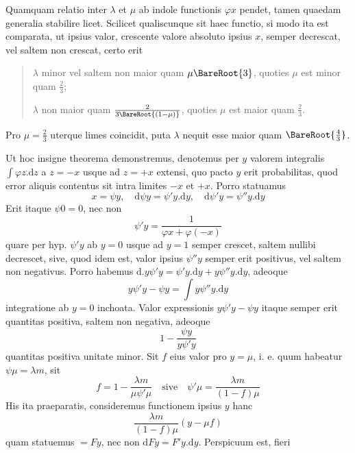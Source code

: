 Quamquam relatio inter \(\lambda\) et \(\mu\) ab indole functionis \(\varphi x\) pendet, tamen quaedam generalia stabilire licet. Scilicet qualiscunque sit haec functio, si modo ita est comparata, ut ipsius valor, crescente valore absoluto ipsius \(x\), semper decrescat, vel saltem non crescat, certo erit
\begin{quote}
\(\lambda\) minor vel saltem non maior quam \(\mu\BareRoot{3}\), quoties \(\mu\) est minor quam \(\tfrac23\);

\(\lambda\) non maior quam \(\frac{2}{3\BareRoot{(1-\mu)}}\), quoties \(\mu\) est maior quam \(\tfrac23\).
\end{quote}
Pro \(\mu=\tfrac23\) uterque limes coincidit, puta \(\lambda\) nequit esse maior quam \(\BareRoot{\tfrac43}\).

Ut hoc insigne theorema demonstremus, denotemus per \(y\) valorem integralis \(\int\varphi z.\mathrm{d}z\) a \(z=-x\) usque ad \(z=+x\) extensi, quo pacto \(y\) erit probabilitas, quod error aliquis contentus sit intra limites \(-x\) et \(+x\). Porro statuamus
\[
x=\psi y,\quad \mathrm{d}\psi y=\psi'y.\mathrm{d}y,\quad \mathrm{d}\psi'y=\psi''y.\mathrm{d}y
\]
Erit itaque \(\psi0=0\), nec non
\[
\psi'y=\frac{1}{\varphi x+\varphi(-x)}
\]
quare per hyp. \(\psi'y\) ab \(y=0\) usque ad \(y=1\) semper crescet, saltem nullibi decrescet, sive, quod idem est, valor ipsius \(\psi''y\) semper erit positivus, vel saltem non negativus. Porro habemus \(\mathrm{d}.y\psi'y=\psi'y.\mathrm{d}y+y\psi''y.\mathrm{d}y\), adeoque
\[
y\psi'y-\psi y=\int y\psi''y.\mathrm{d}y
\]
integratione ab \(y=0\) inchoata. Valor expressionis \(y\psi'y-\psi y\) itaque semper erit quantitas positiva, saltem non negativa, adeoque
\[
1-\frac{\psi y}{y\psi'y}
\]
quantitas positiva unitate minor. Sit \(f\) eius valor pro \(y=\mu\), i. e. quum habeatur \(\psi\mu=\lambda m\), sit
\[
f=1-\frac{\lambda m}{\mu\psi'\mu}\quad\text{sive}\quad\psi'\mu=\frac{\lambda m}{(1-f)\mu}
\]
His ita praeparatis, consideremus functionem ipsius \(y\) hanc
\[
\frac{\lambda m}{(1-f)\mu}(y-\mu f)
\]
quam statuemus \(=Fy\), nec non \(\mathrm{d}Fy=F'y.\mathrm{d}y\). Perspicuum est, fieri
